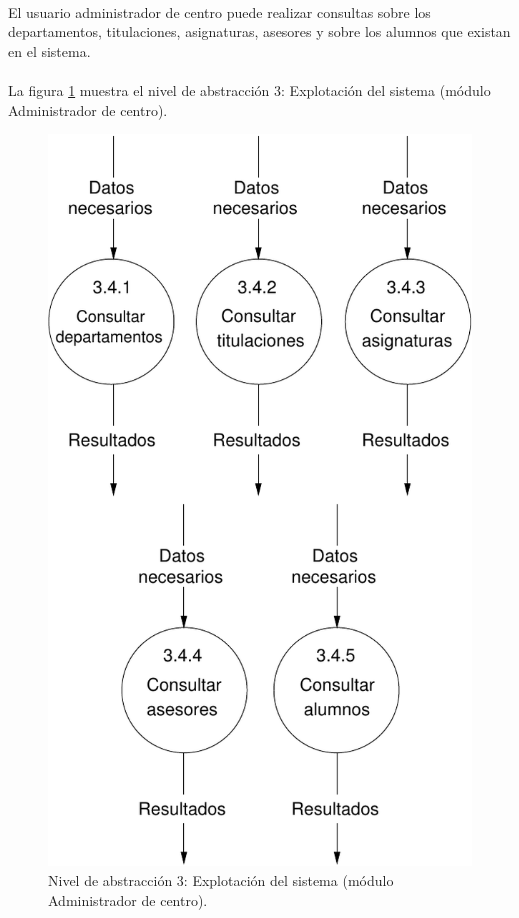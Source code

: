 \paragraph{}El usuario administrador de centro puede realizar consultas sobre
los departamentos, titulaciones, asignaturas, asesores y sobre los alumnos que
existan en el sistema.

\paragraph{}La figura \ref{diagramaNivel3-ExplotacionSistema-adminCentro}
muestra el nivel de abstracción 3: Explotación del sistema (módulo Administrador
de centro).

  \begin{figure}[!ht]
    \begin{center}
      \includegraphics[]{08.Analisis_Funcional/8.2.DFDs/Niveles/Nivel3/AdministradorCentro/ExplotacionSistema/Diagramas/nivel3-ExplotacionSistema.pdf}
      \caption{Nivel de abstracción 3: Explotación del sistema (módulo
      Administrador de centro).}
      \label{diagramaNivel3-ExplotacionSistema-adminCentro}
    \end{center}
  \end{figure}
